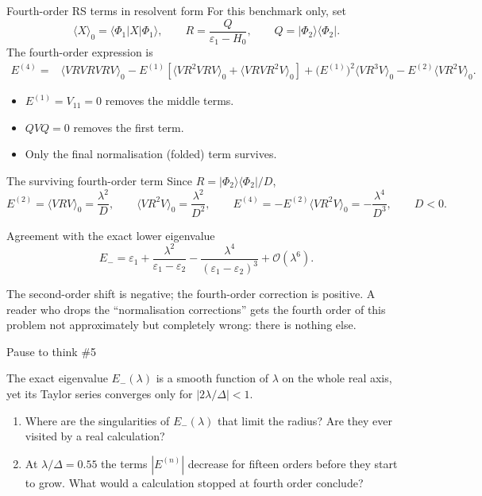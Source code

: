 \documentclass[aspectratio=169,10pt]{beamer}
\newcounter{thinkctr}
\newcommand{\thinkq}[2]{%
  \stepcounter{thinkctr}%
  \vfill
  \begin{tcolorbox}[enhanced,colback=palewarm,colframe=warm,boxrule=1.2pt,arc=4pt,
    grow to left by=6mm,grow to right by=6mm,
    left=16pt,right=16pt,top=16pt,bottom=18pt,
    fonttitle=\bfseries\Large,fontupper=\Large,
    title={Pause to think \#\thethinkctr\hfill\mdseries\normalsize(about #1 min -- discuss with your neighbour)}]
  #2
  \end{tcolorbox}
  \vfill}
\newcommand{\ket}[1]{\vert #1\rangle}
\newcommand{\bra}[1]{\langle #1\vert}
\newcommand{\mel}[3]{\langle #1\lvert #2\rvert #3\rangle}
\newcommand{\av}[1]{\langle #1\rangle_0}
\newcommand{\ord}[1]{\mathcal O(#1)}
\begin{document}
\begin{frame}{Fourth-order RS terms in resolvent form}
For this benchmark only, set
\[
\av{X}=\mel{\Phi_1}{X}{\Phi_1},\qquad
R=\frac{Q}{\varepsilon_1-H_0},\qquad Q=\ket{\Phi_2}\bra{\Phi_2}.
\]
The fourth-order expression is
\begin{align*}
E^{(4)}={}&\av{VRVRVRV}
-E^{(1)}\left[\av{VR^2VRV}+\av{VRVR^2V}\right]
+\bigl(E^{(1)}\bigr)^2\av{VR^3V}
-E^{(2)}\av{VR^2V}.
\end{align*}
\begin{itemize}
\item \(E^{(1)}=V_{11}=0\) removes the middle terms.
\item \(QVQ=0\) removes the first term.
\item Only the final normalisation (folded) term survives.
\end{itemize}
\end{frame}

\begin{frame}{The surviving fourth-order term}
Since \(R=\ket{\Phi_2}\bra{\Phi_2}/D\),
\[
E^{(2)}=\av{VRV}=\frac{\lambda^2}{D},\qquad
\av{VR^2V}=\frac{\lambda^2}{D^2},
\qquad
\boxed{E^{(4)}=-E^{(2)}\av{VR^2V}
=-\frac{\lambda^4}{D^3},\qquad D<0.}
\]
\begin{exampleblock}{Agreement with the exact lower eigenvalue}
\[
E_-=\varepsilon_1+
\frac{\lambda^2}{\varepsilon_1-\varepsilon_2}
-\frac{\lambda^4}{(\varepsilon_1-\varepsilon_2)^3}
+\ord{\lambda^6}.
\]
\end{exampleblock}
\small The second-order shift is negative; the fourth-order correction is positive. A reader who drops the ``normalisation corrections'' gets the fourth order of this problem not approximately but completely wrong: there is nothing else.
\end{frame}

\begin{frame}{Pause to think \#5}
\thinkq{3}{The exact eigenvalue \(E_-(\lambda)\) is a smooth function of \(\lambda\) on the whole real axis, yet its Taylor series converges only for \(|2\lambda/\Delta|<1\).
\begin{enumerate}
\item Where are the singularities of \(E_-(\lambda)\) that limit the radius? Are they ever visited by a real calculation?
\item At \(\lambda/\Delta=0.55\) the terms \(|E^{(n)}|\) decrease for fifteen orders before they start to grow. What would a calculation stopped at fourth order conclude?
\end{enumerate}}
\end{frame}
\end{document}
